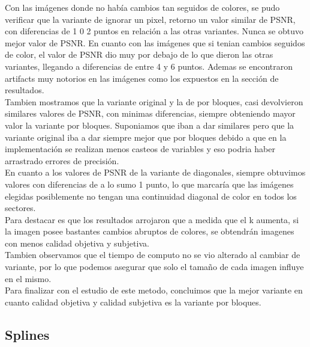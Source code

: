 \documentclass[a4paper]{article}
\newcounter{col}
\begin{document}
 Con las im\'agenes donde no hab\'ia cambios tan seguidos de colores, se pudo verificar que la variante de ignorar un pixel, retorno un valor similar de PSNR, con diferencias de 1 0 2 puntos en relaci\'on a las otras variantes. Nunca se obtuvo mejor valor de PSNR.
 En cuanto con las im\'agenes que si tenian cambios seguidos de color, el valor de PSNR dio muy por debajo de lo que dieron las otras variantes, llegando a diferencias de entre 4 y 6 puntos. Ademas se encontraron artifacts muy notorios en las im\'agenes como los expuestos en la secci\'on de resultados.\\
 Tambien mostramos que la variante original y la de por bloques, casi devolvieron similares valores de PSNR, con minimas diferencias, siempre obteniendo mayor valor la variante por bloques. Suponiamos que iban a dar similares pero que la variante original iba a dar siempre mejor que por bloques debido a que en la implementaci\'on se realizan menos casteos de variables y eso podria haber arrastrado errores de precisi\'on.\\
 En cuanto a los valores de PSNR de la variante de diagonales, siempre obtuvimos valores con diferencias de a lo sumo 1 punto, lo que marcar\'ia que las im\'agenes elegidas posiblemente no tengan una continuidad diagonal de color en todos los sectores.\\
 Para destacar es que los resultados arrojaron que a medida que el k aumenta, si la imagen posee bastantes cambios abruptos de colores, se obtendr\'an imagenes con menos calidad objetiva y subjetiva.\\
 Tambien observamos que el tiempo de computo no se vio alterado al cambiar de variante, por lo que podemos asegurar que solo el tamaño de cada imagen influye en el mismo.\\
 Para finalizar con el estudio de este metodo, concluimos que la mejor variante en cuanto calidad objetiva y calidad subjetiva es la variante por bloques.

\subsection{Splines}
\label{Splines}
\end{document}
